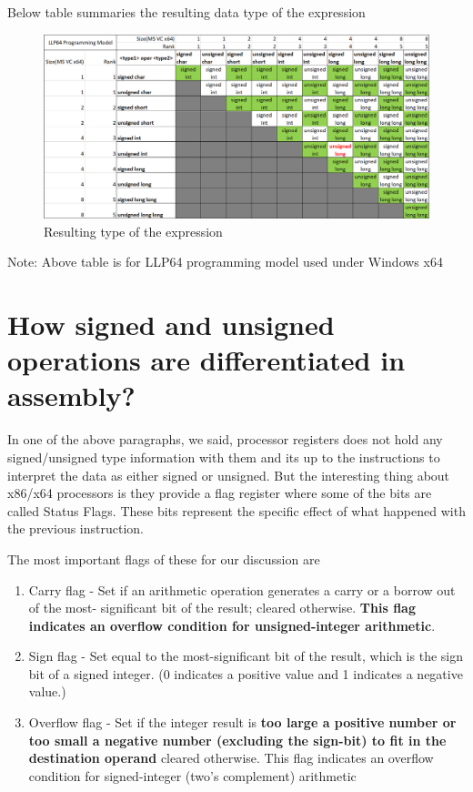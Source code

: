 \documentclass{article}
\begin{document}
Below table summaries the resulting data type of the expression
\begin{figure}[H]
\centering
\includegraphics[width=\textwidth]{Resulting-Datatypes.png}
\caption{Resulting type of the expression}
\end{figure}

Note: Above table is for LLP64 programming model used under Windows x64

\section{How signed and unsigned operations are differentiated in assembly?}
In one of the above paragraphs, we said, processor registers does not hold any
signed/unsigned type information with them and its up to the instructions to
interpret the data as either signed or unsigned. But the interesting thing
about x86/x64 processors is they provide a flag register where some of the
bits are called Status Flags. These bits represent the specific effect of
what happened with the previous instruction.

The most important flags of these for our discussion are

\begin{enumerate}[noitemsep]
    \item Carry flag - Set if an arithmetic operation generates a carry or a borrow out of the most-
significant bit of the result; cleared otherwise. \textbf{This flag indicates
an overflow condition for unsigned-integer arithmetic}.
    \item Sign flag - Set equal to the most-significant bit of the result, which is the sign bit of a signed
integer. (0 indicates a positive value and 1 indicates a negative value.)
    \item Overflow flag - Set if the integer result is \textbf{too large a
    positive number or too small a negative number (excluding the sign-bit) to
    fit in the destination operand} cleared otherwise. This flag
indicates an overflow condition for signed-integer (two's complement) arithmetic
\end{enumerate}
\end{document}
